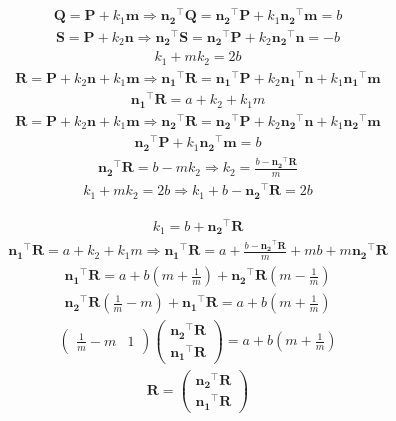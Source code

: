 \documentclass{beamer}
\theoremstyle{remark}
\newcommand{\myvec}[1]{\ensuremath{\begin{pmatrix}#1\end{pmatrix}}}
\let\vec\mathbf
\numberwithin{equation}{section}
\begin{document}
\begin{frame}
\begin{align}
\vec{Q}=\vec{P}+k_1\vec{m} \Longrightarrow
\vec{n_2}^\top\vec{Q}=\vec{n_2}^\top\vec{P}+k_1\vec{n_2}^\top\vec{m}=b
\end{align}
\begin{align}
\vec{S}=\vec{P}+k_2\vec{n} \Longrightarrow 
\vec{n_2}^\top\vec{S}=\vec{n_2}^\top\vec{P}+k_2\vec{n_2}^\top\vec{n}=-b
\end{align}
\begin{align}
k_1+mk_2=2b
\end{align}
\begin{align}
\vec{R}=\vec{P}+k_2\vec{n}+k_1\vec{m} \Longrightarrow
\vec{n_1}^\top\vec{R}=\vec{n_1}^\top\vec{P}+k_2\vec{n_1}^\top\vec{n}+k_1\vec{n_1}^\top\vec{m}
\end{align}
\begin{align}
\vec{n_1}^\top\vec{R}=a+k_2+k_1m
\end{align}
\begin{align}
\vec{R}=\vec{P}+k_2\vec{n}+k_1\vec{m} \Longrightarrow
\vec{n_2}^\top\vec{R}=\vec{n_2}^\top\vec{P}+k_2\vec{n_2}^\top\vec{n}+k_1\vec{n_2}^\top\vec{m}
\end{align}
\begin{align}
\vec{n_2}^\top\vec{P}+k_1\vec{n_2}^\top\vec{m}=b
\end{align}
\begin{align}
\vec{n_2}^\top\vec{R}=b-mk_2 \Longrightarrow k_2=\frac{b-\vec{n_2}^\top\vec{R}}{m}
\end{align}
\begin{align}
k_1+mk_2=2b \Longrightarrow k_1+b-\vec{n_2}^\top\vec{R}=2b
\end{align}
\end{frame}
\begin{frame}
\begin{align}
k_1=b+\vec{n_2}^\top\vec{R}
\end{align}
\begin{align}
\vec{n_1}^\top\vec{R}=a+k_2+k_1m \Longrightarrow \vec{n_1}^\top\vec{R}=a+\frac{b-\vec{n_2}^\top\vec{R}}{m}+mb+m\vec{n_2}^\top\vec{R}
\end{align}
\begin{align}
\vec{n_1}^\top\vec{R}=a+b\left( m + \frac{1}{m} \right)
+\vec{n_2}^\top\vec{R}\left( m - \frac{1}{m} \right)
\end{align}
\begin{align}
\vec{n_2}^\top\vec{R}\left(\frac{1}{m} - m \right)+\vec{n_1}^\top\vec{R}=a+b\left( m + \frac{1}{m} \right)
\end{align}
\begin{align}
\myvec{ \frac{1}{m} - m & 1}\myvec{\vec{n_2}^\top\vec{R} \\ \vec{n_1}^\top\vec{R}}=a+b\left( m + \frac{1}{m} \right)
\end{align}
\begin{align}
\vec{R}=\myvec{\vec{n_2}^\top\vec{R} \\ \vec{n_1}^\top\vec{R}}
\end{align}
\end{frame}
\end{document}
